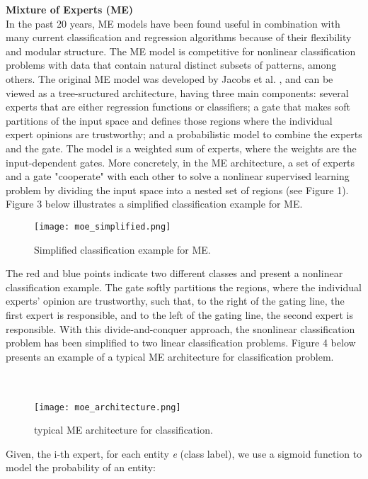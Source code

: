 \documentclass{sig-alternate-05-2015}
\begin{document}
\vspace{1.5em}
\noindent\textbf{Mixture of Experts (ME)} \\
In the past 20 years, ME models have been found useful in combination with many current classification and regression algorithms because of their flexibility and modular structure. The ME model is competitive for nonlinear classification problems with data that contain natural distinct subsets of patterns, among others. The original ME model was developed by Jacobs et al. \cite{12}, and can be viewed as a tree-sructured architecture, having three main components: several experts that are either regression functions or classifiers; a gate that makes soft partitions of the input space and defines those regions where the individual expert opinions are trustworthy; and a probabilistic model to combine the experts and the gate. The model is a weighted sum of experts, where the weights are the input-dependent gates. More concretely, in the ME architecture, a set of experts and a gate "cooperate" with each other to solve a nonlinear supervised learning problem by dividing the input space into a nested set of regions (see Figure 1). Figure 3 below illustrates a simplified classification example for ME. 

\begin{figure}[h!]
\noindent
\small\caption{Simplified classification example for ME.}\small
\texttt{[image: moe\_simplified.png]}
\end{figure}

The red and blue points indicate two different classes and present a nonlinear classification example. The gate softly partitions the regions, where the individual experts' opinion are trustworthy, such that, to the right of the gating line, the first expert is responsible, and to the left of the gating line, the second expert is responsible. With this divide-and-conquer approach, the snonlinear classification problem has been simplified to two linear classification problems. Figure 4 below presents an example of a typical ME architecture for classification problem. \\ \\\

\begin{figure}[h!]
\noindent
\small\caption{typical ME architecture for classification.}\small
\texttt{[image: moe\_architecture.png]}
\end{figure}


\vspace{6em}
\noindent
Given, the i-th expert, for each entity \textit{e} (class label), we use a sigmoid function to model the probability of an entity: 
\end{document}
